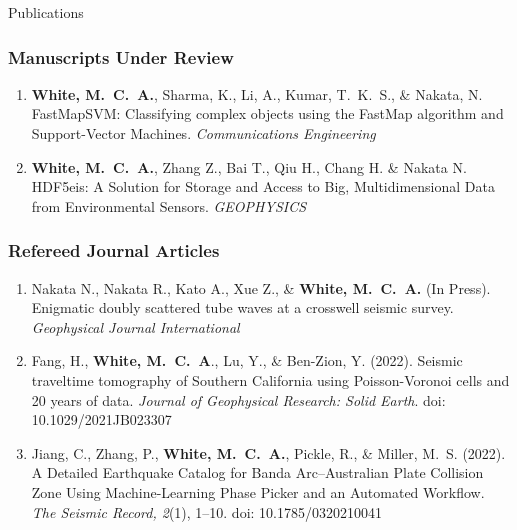 \begin{rSection}{Publications}
	\subsubsection*{Manuscripts Under Review}
	\begin{enumerate}
		\item \textbf{White, M.~C.~A.}, Sharma, K., Li, A., Kumar, T.~K.~S., \& Nakata, N. FastMapSVM: Classifying complex objects using the FastMap algorithm and Support-Vector Machines. \textit{Communications Engineering}
		
		\item \textbf{White, M.~C.~A.}, Zhang Z., Bai T., Qiu H., Chang H. \& Nakata N. HDF5eis: A Solution for Storage and Access to Big, Multidimensional Data from Environmental Sensors. \textit{GEOPHYSICS}
		
	\end{enumerate}
	\subsubsection*{Refereed Journal Articles}
		\begin{enumerate}
					
		\item Nakata N., Nakata R., Kato A., Xue Z., \& \textbf{White, M.~C.~A.} (In Press). Enigmatic doubly scattered tube waves at a crosswell seismic survey. \textit{Geophysical Journal International}
			
		\item Fang, H., \textbf{White, M.~C.~A}., Lu, Y., \& Ben-Zion, Y. (2022). Seismic traveltime tomography of Southern California using Poisson-Voronoi cells and 20 years of data. \textit{Journal of Geophysical Research: Solid Earth}. doi: 10.1029/2021JB023307
		
		
		\item Jiang, C., Zhang, P., \textbf{White, M.~C.~A.}, Pickle, R., \& Miller, M.~S. (2022). A Detailed Earthquake Catalog for Banda Arc–Australian Plate Collision Zone Using Machine-Learning Phase Picker and an Automated Workflow. \textit{The Seismic Record, 2}(1), 1–10. doi: 10.1785/0320210041
		

\end{enumerate}
\end{rSection}
